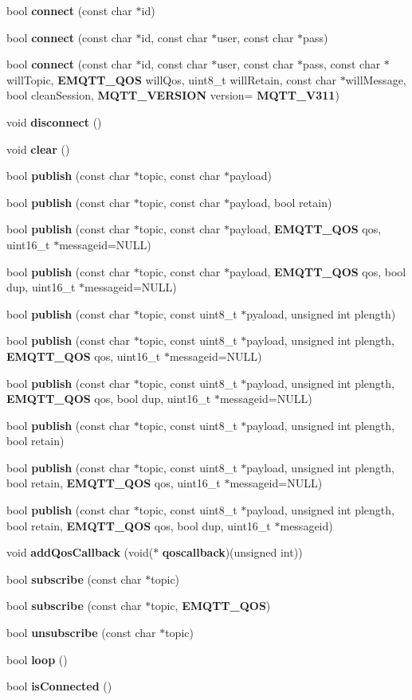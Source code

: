 \begin{DoxyCompactItemize}
bool \textbf{ connect} (const char $\ast$id)
\item 
bool \textbf{ connect} (const char $\ast$id, const char $\ast$user, const char $\ast$pass)
\item 
bool \textbf{ connect} (const char $\ast$id, const char $\ast$user, const char $\ast$pass, const char $\ast$will\+Topic, \textbf{ E\+M\+Q\+T\+T\+\_\+\+Q\+OS} will\+Qos, uint8\+\_\+t will\+Retain, const char $\ast$will\+Message, bool clean\+Session, \textbf{ M\+Q\+T\+T\+\_\+\+V\+E\+R\+S\+I\+ON} version=\textbf{ M\+Q\+T\+T\+\_\+\+V311})
\item 
void \textbf{ disconnect} ()
\item 
void \textbf{ clear} ()
\item 
bool \textbf{ publish} (const char $\ast$topic, const char $\ast$payload)
\item 
bool \textbf{ publish} (const char $\ast$topic, const char $\ast$payload, bool retain)
\item 
bool \textbf{ publish} (const char $\ast$topic, const char $\ast$payload, \textbf{ E\+M\+Q\+T\+T\+\_\+\+Q\+OS} qos, uint16\+\_\+t $\ast$messageid=N\+U\+LL)
\item 
bool \textbf{ publish} (const char $\ast$topic, const char $\ast$payload, \textbf{ E\+M\+Q\+T\+T\+\_\+\+Q\+OS} qos, bool dup, uint16\+\_\+t $\ast$messageid=N\+U\+LL)
\item 
bool \textbf{ publish} (const char $\ast$topic, const uint8\+\_\+t $\ast$pyaload, unsigned int plength)
\item 
bool \textbf{ publish} (const char $\ast$topic, const uint8\+\_\+t $\ast$payload, unsigned int plength, \textbf{ E\+M\+Q\+T\+T\+\_\+\+Q\+OS} qos, uint16\+\_\+t $\ast$messageid=N\+U\+LL)
\item 
bool \textbf{ publish} (const char $\ast$topic, const uint8\+\_\+t $\ast$payload, unsigned int plength, \textbf{ E\+M\+Q\+T\+T\+\_\+\+Q\+OS} qos, bool dup, uint16\+\_\+t $\ast$messageid=N\+U\+LL)
\item 
bool \textbf{ publish} (const char $\ast$topic, const uint8\+\_\+t $\ast$payload, unsigned int plength, bool retain)
\item 
bool \textbf{ publish} (const char $\ast$topic, const uint8\+\_\+t $\ast$payload, unsigned int plength, bool retain, \textbf{ E\+M\+Q\+T\+T\+\_\+\+Q\+OS} qos, uint16\+\_\+t $\ast$messageid=N\+U\+LL)
\item 
bool \textbf{ publish} (const char $\ast$topic, const uint8\+\_\+t $\ast$payload, unsigned int plength, bool retain, \textbf{ E\+M\+Q\+T\+T\+\_\+\+Q\+OS} qos, bool dup, uint16\+\_\+t $\ast$messageid)
\item 
void \textbf{ add\+Qos\+Callback} (void($\ast$\textbf{ qoscallback})(unsigned int))
\item 
bool \textbf{ subscribe} (const char $\ast$topic)
\item 
bool \textbf{ subscribe} (const char $\ast$topic, \textbf{ E\+M\+Q\+T\+T\+\_\+\+Q\+OS})
\item 
bool \textbf{ unsubscribe} (const char $\ast$topic)
\item 
bool \textbf{ loop} ()
\item 
bool \textbf{ is\+Connected} ()
\end{DoxyCompactItemize}
